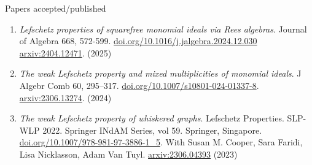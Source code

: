 \documentclass[12pt]{resume} %
\begin{document}



\begin{rSection}{Papers accepted/published}
    \begin{enumerate}
        \item \textit{Lefschetz properties of squarefree monomial ideals via Rees algebras}. Journal of Algebra 668, 572-599. \href{https://doi.org/10.1016/j.jalgebra.2024.12.030}{doi.org/10.1016/j.jalgebra.2024.12.030} \href{https://arxiv.org/abs/2404.12471}{arxiv:2404.12471}. (2025)
        \item \textit{The weak Lefschetz property and mixed multiplicities of monomial ideals}. J Algebr Comb 60, 295–317. \href{https://doi.org/10.1007/s10801-024-01337-8}{doi.org/10.1007/s10801-024-01337-8}. \href{https://arxiv.org/abs/2306.13274}{arxiv:2306.13274}. (2024)
        \item \textit{The weak Lefschetz property of whiskered graphs}.  Lefschetz Properties. SLP-WLP 2022. Springer INdAM Series, vol 59. Springer, Singapore. \href{https://doi.org/10.1007/978-981-97-3886-1_5}{doi.org/10.1007/978-981-97-3886-1\_5}. With Susan M. Cooper, Sara Faridi, Lisa Nicklasson, Adam Van Tuyl.  \href{https://arxiv.org/abs/2306.04393}{arxiv:2306.04393} (2023)
    \end{enumerate}
\end{rSection}
\end{document}

